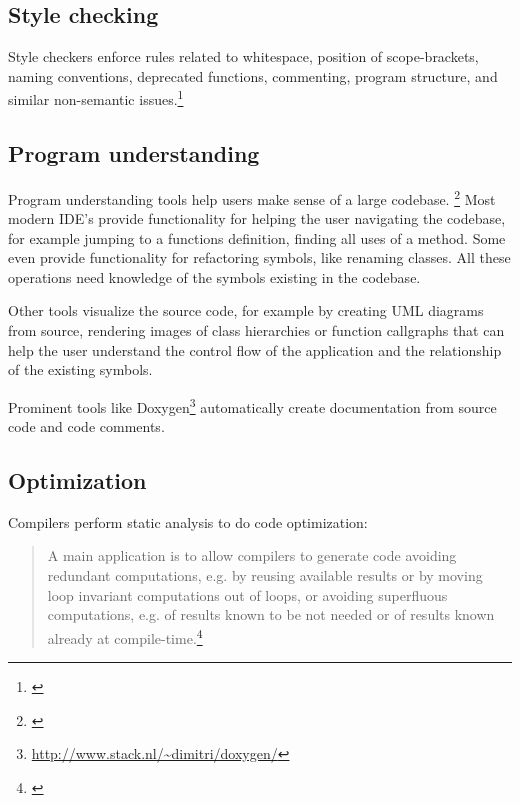 \subsection{Style checking}

Style checkers enforce rules related to whitespace, position of scope-brackets, naming conventions, deprecated functions, commenting, program structure, and similar non-semantic issues.\footnote{\citep[25]{SecureProgramming}}


\subsection{Program understanding}

Program understanding tools help users make sense of a large codebase. \footnote{\citep[27]{SecureProgramming}} Most modern IDE's provide functionality for helping the user navigating the codebase, for example jumping to a functions definition, finding all uses of a method. Some even provide functionality for refactoring symbols, like renaming classes. All these operations need knowledge of the symbols existing in the codebase.

Other tools visualize the source code, for example by creating UML diagrams from source, rendering images of class hierarchies or function callgraphs that can help the user understand the control flow of the application and the relationship of the existing symbols.


Prominent tools like Doxygen\footnote{\url{http://www.stack.nl/~dimitri/doxygen/}} automatically create documentation from source code and code comments.

\subsection{Optimization}

Compilers perform static analysis to do code optimization:

\begin{quotation}
A main application is to allow compilers to generate code avoiding redundant computations, e.g. by reusing available results or by moving loop invariant computations out of loops, or avoiding superfluous computations, e.g. of results known to be not needed or of results known already at compile-time.\footnote{\citep[1]{ProgramAnalysis}}
\end{quotation}


